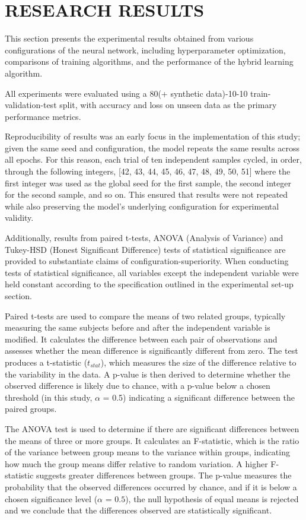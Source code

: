 \section{RESEARCH RESULTS}

This section presents the experimental results obtained from various configurations of the 
neural network, including hyperparameter optimization, comparisons of training algorithms, 
and the performance of the hybrid learning algorithm. 

All experiments were evaluated using 
a 80(+ synthetic data)-10-10 train-validation-test split, with accuracy and loss on unseen data 
as the primary performance metrics.

Reproducibility of results was an early focus in the implementation of this study; given the same
seed and configuration, the model repeats the same results across all epochs. For this reason,
each trial of ten independent samples cycled, in order, through the following integers, [42, 43, 44, 45, 46, 47, 48, 49, 50, 51]
where the first integer was used as the global seed for the first sample, the second integer for the second sample, and so on.
This ensured that results were not repeated while also preserving the model's underlying configuration for experimental validity. 

Additionally, results from paired t-tests, ANOVA (Analysis of Variance) and Tukey-HSD (Honest Significant Difference) tests 
of statistical significance are provided to substantiate claims of configuration-superiority. When conducting tests of statistical 
significance, all variables except the independent variable were held constant according 
to the specification outlined in the experimental set-up section.

Paired t-tests are used to compare the means of two related groups, typically 
measuring the same subjects before and after the independent variable is modified. It calculates the difference
 between each pair of observations and assesses whether the mean difference is significantly different 
 from zero. The test produces a t-statistic ($t_{stat}$), which measures the size of the difference relative to the 
 variability in the data. A p-value is then derived to determine whether the observed difference is likely 
 due to chance, with a p-value below a chosen threshold (in this study, $\alpha$ = 0.5) indicating a significant difference 
 between the paired groups.

The ANOVA test is used to determine if there are significant 
differences between the means of three or more groups. It calculates an F-statistic, which is the ratio 
of the variance between group means to the variance within groups, indicating how much the group means 
differ relative to random variation. A higher F-statistic suggests greater differences between groups. 
The p-value measures the probability that the observed differences occurred by chance, and if it is below 
a chosen significance level ($\alpha$ = $0.5$), the null hypothesis of equal means is rejected
and we conclude that the differences observed are statistically significant.

